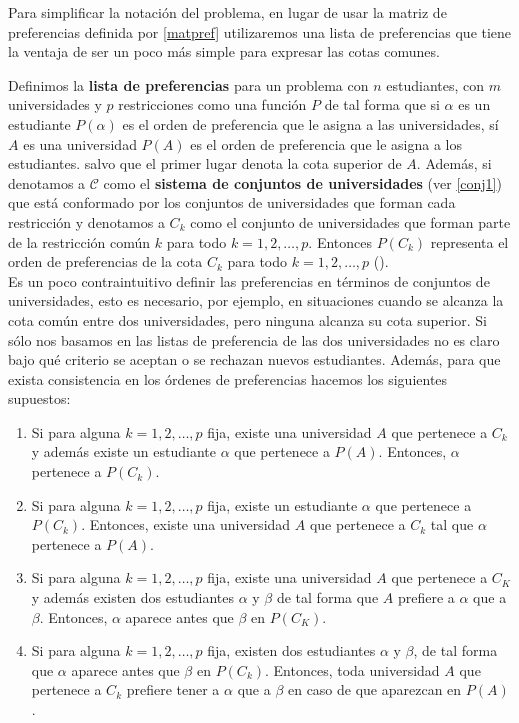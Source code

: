 Para simplificar la notación del problema, en lugar de usar la matriz de preferencias definida por \ref{matpref} utilizaremos una lista de preferencias que tiene la ventaja de ser un poco más simple para expresar las cotas comunes. 

\begin{dfn}
\label{listpref}
Definimos la \textbf{lista de preferencias} para un problema con $n$ estudiantes, con $m$ universidades y $p$ restricciones
como una función $P$ de tal forma que si $\alpha$ es un estudiante $P(\alpha)$ es el orden de preferencia que le asigna a las universidades,
sí $A$ es una universidad $P(A)$ es el orden de preferencia que le asigna a los estudiantes. salvo que el primer lugar denota la cota superior de $A$.
Además, si denotamos a $\mathcal{C}$ como el \textbf{sistema de conjuntos de universidades} (ver \ref{conj1}) que está conformado por los conjuntos de universidades que forman cada restricción y denotamos a $C_k$ como el conjunto de universidades que forman parte de la restricción común $k$ para todo $k=1,2,\dots,p$.
Entonces $P(C_k)$ representa el orden de preferencias de la cota $C_k$ para todo $k=1,2,\dots,p$ ().
\\ Es un poco contraintuitivo definir las preferencias en términos de conjuntos de universidades, esto es necesario, por ejemplo, en situaciones cuando se alcanza la cota común entre dos universidades, pero ninguna alcanza su cota superior. Si sólo nos basamos en las listas de preferencia de las dos universidades no es claro bajo qué criterio se aceptan o se rechazan nuevos estudiantes. Además, para que exista consistencia en los órdenes de preferencias hacemos los siguientes supuestos:
\begin{enumerate}
\item Si para alguna $k=1,2,\dots,p$ fija, existe una universidad $A$ que pertenece a $C_k$ y además existe un estudiante $\alpha$ que pertenece a $P(A)$. Entonces, $\alpha$ pertenece a $P(C_k)$.
\item Si para alguna $k=1,2,\dots,p$ fija, existe un estudiante $\alpha$ que pertenece a $P(C_k)$. Entonces, existe una universidad $A$ que pertenece a $C_k$ tal que $\alpha$ pertenece a $P(A)$.
\item Si para alguna $k=1,2,\dots,p$ fija, existe una universidad $A$ que pertenece a $C_K$ y además existen dos estudiantes $\alpha$ y $\beta$ de tal forma que $A$ prefiere a $\alpha$ que a $\beta$. Entonces, $\alpha$ aparece antes que $\beta$ en $P(C_K)$.
\item Si para alguna $k=1,2,\dots,p$ fija, existen dos estudiantes $\alpha$ y $\beta$, de tal forma que $\alpha$ aparece antes que $\beta$ en $P(C_k)$. Entonces, toda universidad $A$ que pertenece a $C_k$ prefiere tener a $\alpha$ que a $\beta$ en caso de que aparezcan en $P(A)$.
\end{enumerate}
\end{dfn}


